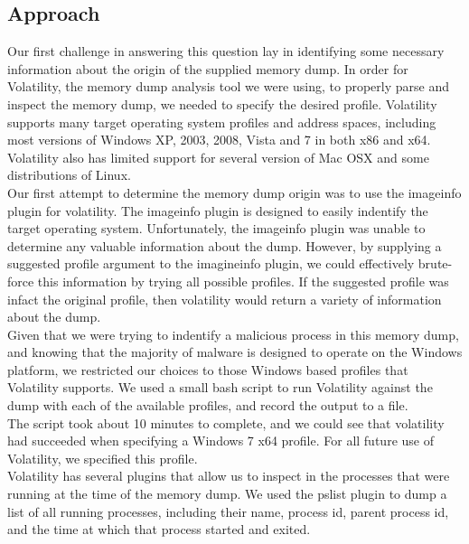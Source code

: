 \subsection{Approach}
Our first challenge in answering this question lay in identifying some necessary information about the origin of the supplied memory dump. In order for Volatility, the memory dump analysis tool we were using, to properly parse and inspect the memory dump, we needed to specify the desired profile. Volatility supports many target operating system profiles and address spaces, including most versions of Windows XP, 2003, 2008, Vista and 7 in both x86 and x64. Volatility also has limited support for several version of Mac OSX and some distributions of Linux. \\
Our first attempt to determine the memory dump origin was to use the imageinfo plugin for volatility. The imageinfo plugin is designed to easily indentify the target operating system. Unfortunately, the imageinfo plugin was unable to determine any valuable information about the dump. However, by supplying a suggested profile argument to the imagineinfo plugin, we could effectively brute-force this information by trying all possible profiles. If the suggested profile was infact the original profile, then volatility would return a variety of information about the dump. \\
Given that we were trying to indentify a malicious process in this memory dump, and knowing that the majority of malware is designed to operate on the Windows platform, we restricted our choices to those Windows based profiles that Volatility supports. We used a small bash script to run Volatility against the dump with each of the available profiles, and record the output to a file.\\ 
The script took about 10 minutes to complete, and we could see that volatility had succeeded when specifying a Windows 7 x64 profile. For all future use of Volatility, we specified this profile.\\
Volatility has several plugins that allow us to inspect in the processes that were running at the time of the memory dump. We used the pslist plugin to dump a list of all running processes, including their name, process id, parent process id, and the time at which that process started and exited. \\
